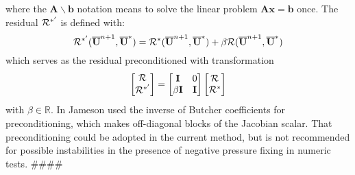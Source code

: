 \documentclass[preprint,12pt]{elsarticle}
\begin{document}
where the $\mathbf{A}\backslash \mathbf{b}$
notation means to solve the linear problem $\mathbf{A}\mathbf{x}=\mathbf{b}$ once.
The residual $\mathcal{R}^{*'}$ is defined with:
\begin{equation}
    \mathcal{R}^{*'}(\overline{\mathbf{U}}^{n+1},\overline{\mathbf{U}}^{*}) = \mathcal{R}^*(\overline{\mathbf{U}}^{n+1},\overline{\mathbf{U}}^{*}) + \beta\mathcal{R}(\overline{\mathbf{U}}^{n+1},\overline{\mathbf{U}}^{*})
\end{equation}
which serves as the residual preconditioned with transformation
\begin{equation*}
    \begin{bmatrix}
        \mathcal{R}^{} \\
        \mathcal{R}^{*'}
    \end{bmatrix} =
    \begin{bmatrix}
        \mathbf{I} & 0 \\ \beta\mathbf{I} & \mathbf{I}
    \end{bmatrix}
    \begin{bmatrix}
        \mathcal{R}^{} \\
        \mathcal{R}^{*}
    \end{bmatrix}
\end{equation*}
with $\beta\in\mathbb{R}$.
In \cite{jameson2017evaluation} Jameson used the inverse of Butcher coefficients
for preconditioning, which makes off-diagonal blocks of
the Jacobian scalar.
That preconditioning could
be adopted in the current method,
but is not recommended for
possible instabilities in the presence of negative pressure fixing in
numeric tests. \#\#\#\#
\end{document}
